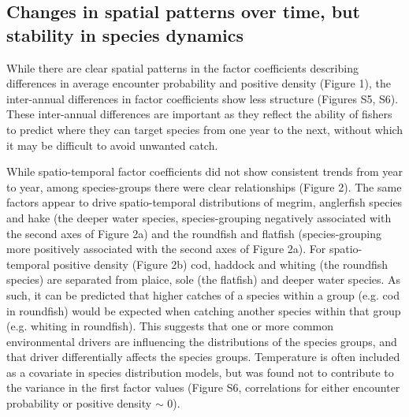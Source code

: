 \documentclass{nature}
\begin{document}
\begin{linenumbers}
\subsection{Changes in spatial patterns over time, but stability in species
	dynamics} While there are clear spatial patterns in the factor
coefficients describing differences in average encounter probability and
positive density (Figure 1), the inter-annual differences in factor
coefficients show less structure (Figures S5, S6). These inter-annual
differences are important as they reflect the ability of fishers to predict
where they can target species from one year to the next, without which it may
be difficult to avoid unwanted catch.

While spatio-temporal factor coefficients did not show consistent trends from
year to year, among species-groups there were clear relationships (Figure 2).
The same factors appear to drive spatio-temporal distributions of megrim,
anglerfish species and hake (the deeper water species, species-grouping
negatively associated with the second axes of Figure 2a) and the roundfish and
flatfish (species-grouping more positively associated with the second axes of
Figure 2a). For spatio-temporal positive density (Figure 2b) cod, haddock and
whiting (the roundfish species) are separated from plaice, sole (the flatfish)
and deeper water species. As such, it can be predicted that higher catches of a
species within a group (e.g. cod in roundfish) would be expected when catching
another species within that group (e.g. whiting in roundfish). This suggests
that one or more common environmental drivers are influencing the distributions
of the species groups, and that driver differentially affects the species
groups. Temperature is often included as a covariate in species distribution
models, but was found not to contribute to the variance in the first factor
values (Figure S6, correlations for either encounter probability or positive
density $\sim$ 0).


\end{linenumbers}
\end{document}
